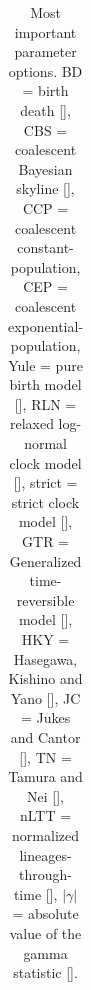 \begin{table}
\begin{tabular}{|p{3.4cm}|p{9.7cm}|p{4.5cm}@{}|}
    \hline
  \end{tabular}
  \caption{
    Most important parameter options.
    BD = birth death [\cite{nee1994reconstructed}], 
    CBS = coalescent Bayesian skyline [\cite{drummond2005bayesian}], 
    CCP = coalescent constant-population, 
    CEP = coalescent exponential-population,
    Yule = pure birth model [\cite{yule}],
    RLN = relaxed log-normal clock model [\cite{drummond2006relaxed}],
    strict = strict clock model [\cite{zuckerkandl1965molecules}], 
    GTR = Generalized time-reversible model [\cite{tavare1986some}], 
    HKY = Hasegawa, Kishino and Yano [\cite{hasegawa1985dating}], 
    JC = Jukes and Cantor [\cite{jukes1969evolution}], 
    TN = Tamura and Nei [\cite{tamura1993estimation}],
    nLTT = normalized lineages-through-time [\cite{janzen2015approximate}],
    $|\gamma|$ = absolute value of the gamma statistic [\cite{pybus2000testing}].
  }
  \label{tab:options}
\bigskip


\end{table}
